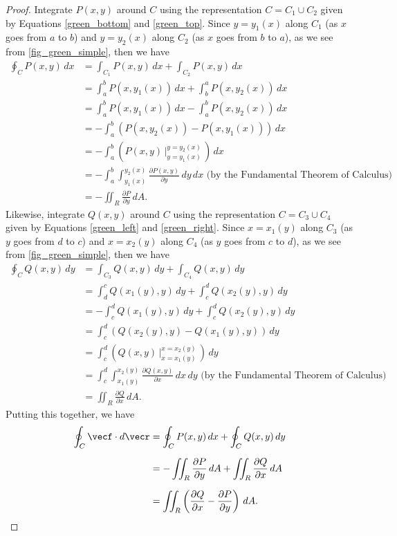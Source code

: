\begin{proof}
 Integrate $P(x,y)$ around $C$ using the representation $C = C_1 \cup C_2$ given by Equations \eqref{green_bottom} and \eqref{green_top}. Since $y = y_1(x)$ along $C_1$ (as $x$ goes from $a$ to $b$) and $y = y_2(x)$ along $C_2$ (as $x$ goes from $b$ to $a$), as we see from \autoref{fig_green_simple}, then we have
 \begin{align*}
  \oint_C P(x,y)\,dx &= \int_{C_1} P(x,y)\,dx + \int_{C_2} P(x,y)\,dx\\
   &= \int_a^b P(x,y_1(x))\,dx + \int_b^a P(x,y_2(x))\,dx\\
   &= \int_a^b P(x,y_1(x))\,dx - \int_a^b P(x,y_2(x))\,dx\\[6pt]
   &= -\int_a^b \left( P(x,y_2(x)) - P(x,y_1(x)) \right)\,dx\\[6pt]
   &= -\int_a^b \left( P(x,y) \,\Big|_{y = y_1(x)}^{y = y_2(x)} \,\right)\,dx\\[6pt]
   &= -\int_a^b \int_{y_1(x)}^{y_2(x)} \frac{\partial P(x,y)}{\partial y}\,dy\,dx \text{ (by the Fundamental Theorem of Calculus)}\\[6pt]
   &= -\iint_{R} \frac{\partial P}{\partial y}\,dA .
 \end{align*}
 Likewise, integrate $Q(x,y)$ around $C$ using the representation $C = C_3 \cup C_4$ given by Equations \eqref{green_left} and \eqref{green_right}. Since $x = x_1(y)$ along $C_3$ (as $y$ goes from $d$ to $c$) and $x = x_2(y)$ along $C_4$ (as $y$ goes from $c$ to $d$), as we see from \autoref{fig_green_simple}, then we have
 \begin{align*}
  \oint_C Q(x,y)\,dy &= \int_{C_3} Q(x,y)\,dy + \int_{C_4} Q(x,y)\,dy\\
   &= \int_d^c Q(x_1(y),y)\,dy + \int_c^d Q(x_2(y),y)\,dy\\
   &= -\int_c^d Q(x_1(y),y)\,dy + \int_c^d Q(x_2(y),y)\,dy\\[6pt]
   &= \int_c^d \left( Q(x_2(y),y) - Q(x_1(y),y) \right)\,dy\\[6pt]
   &= \int_c^d \left( Q(x,y) \,\Big|_{x = x_1(y)}^{x = x_2(y)} \,\right)\,dy\\[6pt]
   &= \int_c^d \int_{x_1(y)}^{x_2(y)} \frac{\partial Q(x,y)}{\partial x}\,dx\,dy \text{ (by the Fundamental Theorem of Calculus)}\\[6pt]
   &= \iint_{R} \frac{\partial Q}{\partial x}\,dA .
 \end{align*}
Putting this together, we have
 \begin{align*}
  \oint_{C}\vecf\cdot d\vecr &= \oint_C P(x,y)\,dx + \oint_C Q(x,y)\,dy\\[6pt]
   &= -\iint_{R} \frac{\partial P}{\partial y}\,dA + \iint_{R} \frac{\partial Q}{\partial x}\,dA\\[6pt]
   &= \iint_{R} \left( \frac{\partial Q}{\partial x} - \frac{\partial P}{\partial y} \right)\,dA .\qedhere
 \end{align*}
\end{proof}

